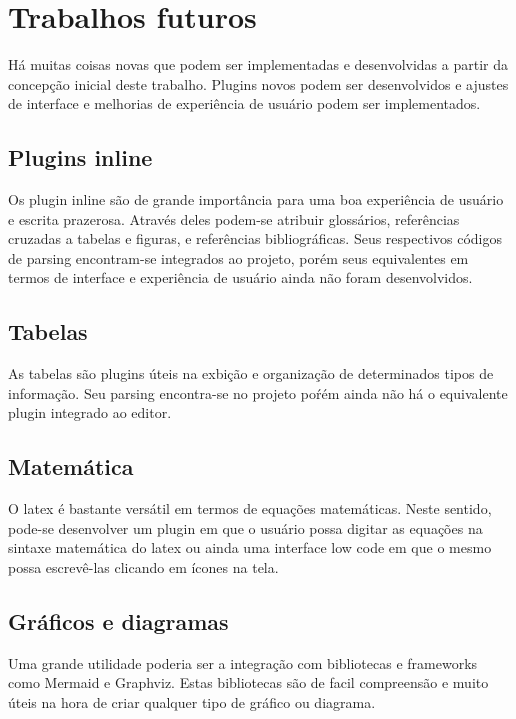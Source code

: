 \section{Trabalhos futuros}

Há muitas coisas novas que podem ser implementadas e desenvolvidas a partir da concepção inicial deste trabalho.
Plugins novos podem ser desenvolvidos e ajustes de interface e melhorias de experiência de usuário podem
ser implementados.

\subsection{Plugins inline}

Os plugin inline são de grande importância para uma boa experiência de usuário
e escrita prazerosa. Através deles podem-se atribuir glossários, referências cruzadas
a tabelas e figuras, e referências bibliográficas. Seus respectivos códigos de parsing
encontram-se integrados ao projeto, porém seus equivalentes em termos de interface
e experiência de usuário ainda não foram desenvolvidos.

\subsection{Tabelas}

As tabelas são plugins úteis na exbição e organização de determinados tipos de informação.
Seu parsing encontra-se no projeto poŕém ainda não há o equivalente plugin integrado ao editor.

\subsection{Matemática}

O
\acrshort{latex}
é bastante versátil em termos de equações matemáticas. Neste sentido, pode-se
desenvolver um plugin em que o usuário possa digitar as equações na sintaxe
matemática do
\acrshort{latex}
ou ainda uma interface low code em que o mesmo possa
escrevê-las clicando em ícones na tela.

\subsection{Gráficos e diagramas}

Uma grande utilidade poderia ser a integração com bibliotecas e frameworks
como Mermaid e Graphviz. Estas bibliotecas são de facil compreensão e muito
úteis na hora de criar qualquer tipo de gráfico ou diagrama.